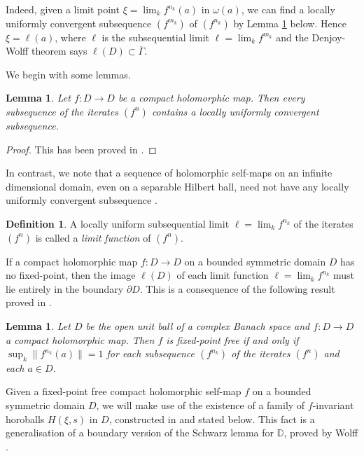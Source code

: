 \documentclass[12pt, twoside]{article}
\newtheorem{lemma}[theorem]{Lemma}
\theoremstyle{definition}
\newtheorem{definition}[theorem]{Definition}
\numberwithin{equation}{section}
\begin{document}
Indeed, given a limit point $\xi= \lim_k f^{n_k}(a)$ in $\omega(a)$, we can find a locally uniformly convergent
subsequence $(f^{m_k})$ of $(f^{n_k})$ by Lemma \ref{cp} below. Hence $\xi=\ell(a)$, where
$\ell$ is the subsequential limit  $\ell = \lim_k f^{m_k}$ and the Denjoy-Wolff theorem says $\ell(D) \subset \overline\Gamma$.

We begin with some lemmas.

\begin{lemma}\label{cp} Let $f: D \longrightarrow D$ be a compact holomorphic map. Then every subsequence
of the iterates $(f^n)$ contains a locally uniformly convergent subsequence.
\end{lemma}
\begin{proof}
This has been proved in \cite[Lemma 1, Remark 1]{cm}.
\end{proof}

In contrast, we note  that a sequence of holomorphic self-maps on an infinite dimensional domain, even on a
separable  Hilbert ball,  need not
have any locally uniformly convergent subsequence \cite[Example 3.1]{kim}.

\begin{definition} A locally uniform subsequential limit  $\ell = \lim_k f^{n_k}$ of the iterates $(f^n)$
is called a {\it limit function} of  $(f^n)$.
\end{definition}

If a compact holomorphic map $f: D \longrightarrow D$ on a bounded symmetric domain $D$ has no fixed-point,
then the image $\ell(D)$ of each limit function $\ell = \lim_k f^{n_k}$
must lie entirely in the boundary $\partial D$. This is a consequence of
the following result proved in \cite{kk2}.

\begin{lemma}\label{kry}
Let $D$ be the open unit ball of a complex Banach space and $f: D\longrightarrow D$
a compact holomorphic map. Then $f$ is fixed-point free if and only if
$\sup_k \|f^{n_k}(a)\|=1$ for each subsequence $(f^{n_k})$ of the iterates $(f^n)$ and  each $a\in D$.
\end{lemma}

Given a fixed-point free compact holomorphic self-map $f$ on a bounded symmetric domain $D$, we will make use of
 the existence of a family of $f$-invariant horoballs $H(\xi,s)$ in $D$, constructed in \cite[Theorem 4.4]{horo}
 and stated below. This fact is a generalisation of  a boundary version of the Schwarz lemma for $\mathbb{D}$, proved by
 Wolff \cite{w1}.
\end{document}
